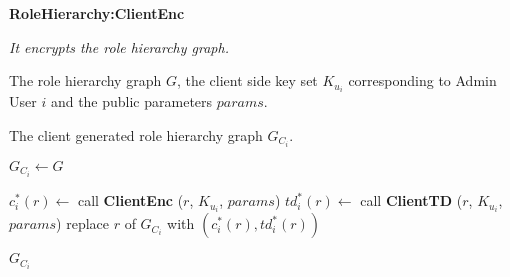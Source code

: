 \documentclass[epsfig,a4paper,11pt,titlepage]{book}
\numberwithin{algorithm}{chapter}
\newcommand{\algofontsize}{\fontsize{11}{12}\selectfont}
\begin{document}
\begin{algorithm} [htp]
{\algofontsize
\caption{\textbf{RoleHierarchy:ClientEnc}}

\label{algo:erbac-deploy-role-hierarchy-client-side}

\begin{algorithmic}[1]

\INPUT \emph{It encrypts the role hierarchy graph.}

\Require The role hierarchy graph $G$, the client side key set $K_{u_i}$ corresponding to Admin User $i$ and the public parameters $params$.

\Ensure The client generated role hierarchy graph $G_{C_i}$.

\medskip

\State $G_{C_i} \leftarrow G$ \label{line:erbac-deploy-rh-cs-copy}

 \label{line:erbac-deploy-rh-cs-loop}

	\State $c^*_i (r) \leftarrow$ call \textbf{ClientEnc} ($r$, $K_{u_i}$, $params$) \label{line:erbac-deploy-rh-cs-enc}
	\State $td^*_i (r) \leftarrow$ call \textbf{ClientTD} ($r$, $K_{u_i}$, $params$) {\algofontsize {}} \label{line:erbac-deploy-rh-cs-td}
	\State replace $r$ of $G_{C_i}$ with $(c^*_i (r), td^*_i (r))$ \label{line:erbac-deploy-rh-cs-replace}

\EndFor

\Return $G_{C_i}$

\end{algorithmic}
}
\end{algorithm}
\end{document}
